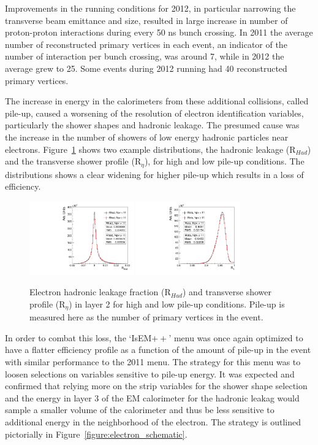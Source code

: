 Improvements in the running conditions for 2012, in particular narrowing the transverse beam emittance and size, resulted in large increase in number of proton-proton interactions during every 50 ns bunch crossing. In 2011 the average number of reconstructed primary vertices in each event, an indicator of the number of interaction per bunch crossing, was around 7, while in 2012 the average grew to 25. Some events during 2012 running had 40 reconstructed primary vertices.

The increase in energy in the calorimeters from these additional collisions, called pile-up, caused a worsening of the resolution of electron identification variables, particularly the shower shapes and hadronic leakage. The presumed cause was the increase in the number of showers of low energy hadronic particles near electrons.  Figure~\ref{figure:electron_pu} shows two example distributions, the hadronic leakage (R$_{Had}$) and the transverse shower profile (R$_{\eta}$), for high and low pile-up conditions. The distributions shows a clear widening for higher pile-up which results in a loss of efficiency. 

\begin{figure}[!t]
\centering 
\includegraphics[width=0.40\textwidth]{figs/electron/rhad_npv}
\includegraphics[width=0.40\textwidth]{figs/electron/reta_npv}
\caption {Electron hadronic leakage fraction (R$_{Had}$) and transverse shower profile (R$_{\eta}$) in layer 2 for high and low pile-up conditions. Pile-up is measured here as the number of primary vertices in the event.}
\label{figure:electron_pu}
\end{figure}


In order to combat this loss, the `IsEM$++$' menu was once again optimized to have a flatter efficiency profile as a function of the amount of pile-up in the event with similar performance to the 2011 menu. The strategy for this menu was to loosen selections on variables sensitive to pile-up energy. It was expected and confirmed that relying more on the strip variables for the shower shape selection and the energy in layer 3 of the EM calorimeter for the hadronic leakag would sample a smaller volume of the calorimeter and thus be less sensitive to additional energy in the neighborhood of the electron. The strategy is outlined pictorially in Figure~\ref{figure:electron_schematic}.  

